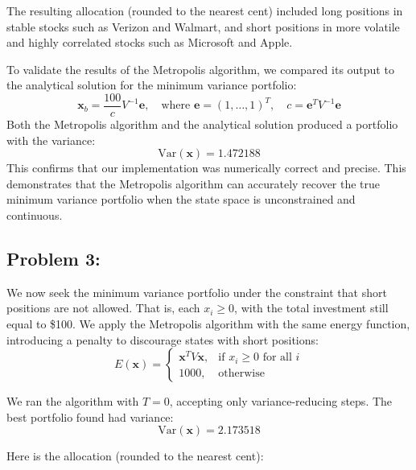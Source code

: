 \documentclass{report}
\begin{document}
The resulting allocation (rounded to the nearest cent) included long positions in stable stocks such as Verizon and Walmart, and short positions in more volatile and highly correlated stocks such as Microsoft and Apple.

To validate the results of the Metropolis algorithm, we compared its output to the analytical solution for the minimum variance portfolio:
\[
\mathbf{x}_b = \frac{100}{c} V^{-1} \mathbf{e}, \quad \text{where } \mathbf{e} = (1,\dots,1)^T, \quad c = \mathbf{e}^T V^{-1} \mathbf{e}
\]
Both the Metropolis algorithm and the analytical solution produced a portfolio with the variance:
\[
\text{Var}(\mathbf{x}) = 1.472188
\]
This confirms that our implementation was numerically correct and precise. This demonstrates that the Metropolis algorithm can accurately recover the true minimum variance portfolio when the state space is unconstrained and continuous.

\pagebreak


\subsection*{Problem 3:}
We now seek the minimum variance portfolio under the constraint that short positions are not allowed. That is, each $x_i \geq 0$, with the total investment still equal to \$100. We apply the Metropolis algorithm with the same energy function, introducing a penalty to discourage states with short positions:
\[
E(\mathbf{x}) = 
\begin{cases}
\mathbf{x}^T V \mathbf{x}, & \text{if } x_i \geq 0 \text{ for all } i \\
1000, & \text{otherwise}
\end{cases}
\]

We ran the algorithm with \( T = 0 \), accepting only variance-reducing steps. The best portfolio found had variance: 
\[
\text{Var}(\mathbf{x}) = 2.173518
\]

Here is the allocation (rounded to the nearest cent):
\end{document}
